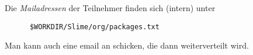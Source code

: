 \documentclass[11pt,german]{article}
\begin{document}
Die \emph{Mailadressen} der Teilnehmer finden sich (intern) unter
\begin{verbatim}
      $WORKDIR/Slime/org/packages.txt
\end{verbatim}
Man kann auch eine email an 
schicken, die dann weiterverteilt wird.

















\end{document}
